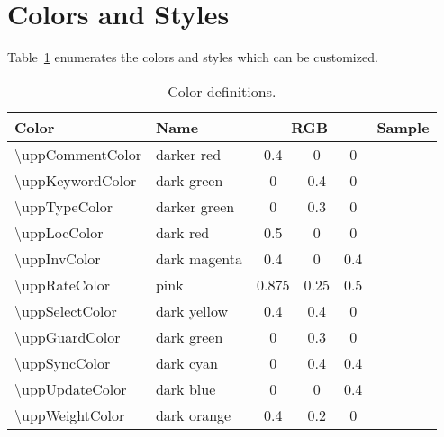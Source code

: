 \documentclass[english,paper=a4,final]{article}
\newcommand{\cmdtt}[1]{{\ttfamily \textbackslash#1}}
\begin{document}
\section{Colors and Styles}
Table~\ref{tab:colors} enumerates the colors and styles which can be customized.

\begin{table}[ht]
  \caption{Color definitions.}\label{tab:colors}
  \centering
  \setlength{\fboxsep}{0pt}
\begin{tabular}{llc@{, }c@{, }cc}
  \toprule
  {\bfseries Color} & {\bfseries Name} & \multicolumn{3}{c}{\bfseries RGB} & {\bfseries Sample} \\
  \midrule
  \cmdtt{uppCommentColor} & darker red & 0.4 & 0 & 0 & \fbox{\color{uppCommentColor}\rule{10mm}{3mm}} \\
  \cmdtt{uppKeywordColor} & dark green & 0 & 0.4 & 0 & \fbox{\color{uppKeywordColor}\rule{10mm}{3mm}} \\
  \cmdtt{uppTypeColor} & darker green & 0 & 0.3 & 0 & \fbox{\color{uppTypeColor}\rule{10mm}{3mm}} \\
  \midrule
  \cmdtt{uppLocColor} & dark red & 0.5 & 0 & 0 & \fbox{\color{uppLocColor}\rule{10mm}{3mm}} \\
  \cmdtt{uppInvColor} & dark magenta & 0.4 & 0 & 0.4 & \fbox{\color{uppInvColor}\rule{10mm}{3mm}} \\
  \cmdtt{uppRateColor} & pink & 0.875 & 0.25 & 0.5 & \fbox{\color{uppRateColor}\rule{10mm}{3mm}} \\
  \cmdtt{uppSelectColor} & dark yellow & 0.4 & 0.4 & 0 & \fbox{\color{uppSelectColor}\rule{10mm}{3mm}} \\
  \cmdtt{uppGuardColor} & dark green & 0 & 0.3 & 0 & \fbox{\color{uppGuardColor}\rule{10mm}{3mm}} \\
  \cmdtt{uppSyncColor} & dark cyan & 0 & 0.4 & 0.4 & \fbox{\color{uppSyncColor}\rule{10mm}{3mm}} \\
  \cmdtt{uppUpdateColor} & dark blue & 0 & 0 & 0.4 & \fbox{\color{uppUpdateColor}\rule{10mm}{3mm}} \\
  \cmdtt{uppWeightColor} & dark orange & 0.4 & 0.2 & 0 & \fbox{\color{uppWeightColor}\rule{10mm}{3mm}} \\
  \bottomrule
\end{tabular}
\end{table}
\end{document}
